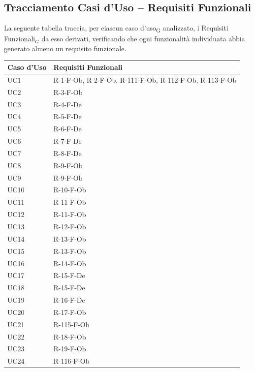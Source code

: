 \documentclass[a4paper, 10pt]{article}
\begin{document}
\subsection{Tracciamento Casi d'Uso -- Requisiti Funzionali}

La seguente tabella traccia, per ciascun caso d'uso\textsubscript{G} analizzato, i Requisiti Funzionali$_G$ da esso derivati, verificando che ogni funzionalit\`a individuata abbia generato almeno un requisito funzionale.

\begingroup
\small
\renewcommand{\arraystretch}{1.3}
\begin{longtable}{|p{2.8cm}|p{10cm}|}
\hline
\rowcolor[HTML]{EFEFEF}
\textbf{Caso d'Uso} & \textbf{Requisiti Funzionali} \\ \hline
\endhead
        UC1 & R-1-F-Ob, R-2-F-Ob, R-111-F-Ob, R-112-F-Ob, R-113-F-Ob \\ \hline
        UC2 & R-3-F-Ob \\ \hline
        UC3 & R-4-F-De \\ \hline
        UC4 & R-5-F-De \\ \hline
        UC5 & R-6-F-De \\ \hline
        UC6 & R-7-F-De \\ \hline
        UC7 & R-8-F-De \\ \hline
        UC8 & R-9-F-Ob \\ \hline
        UC9 & R-9-F-Ob \\ \hline
        UC10 & R-10-F-Ob \\ \hline
        UC11 & R-11-F-Ob \\ \hline
        UC12 & R-11-F-Ob \\ \hline
        UC13 & R-12-F-Ob \\ \hline
        UC14 & R-13-F-Ob \\ \hline
        UC15 & R-13-F-Ob \\ \hline
        UC16 & R-14-F-Ob \\ \hline
        UC17 & R-15-F-De \\ \hline
        UC18 & R-15-F-De \\ \hline
        UC19 & R-16-F-De \\ \hline
        UC20 & R-17-F-Ob \\ \hline
        UC21 & R-115-F-Ob \\ \hline
        UC22 & R-18-F-Ob \\ \hline
        UC23 & R-19-F-Ob \\ \hline
        UC24 & R-116-F-Ob \\ \hline

\end{longtable}
\end{document}
